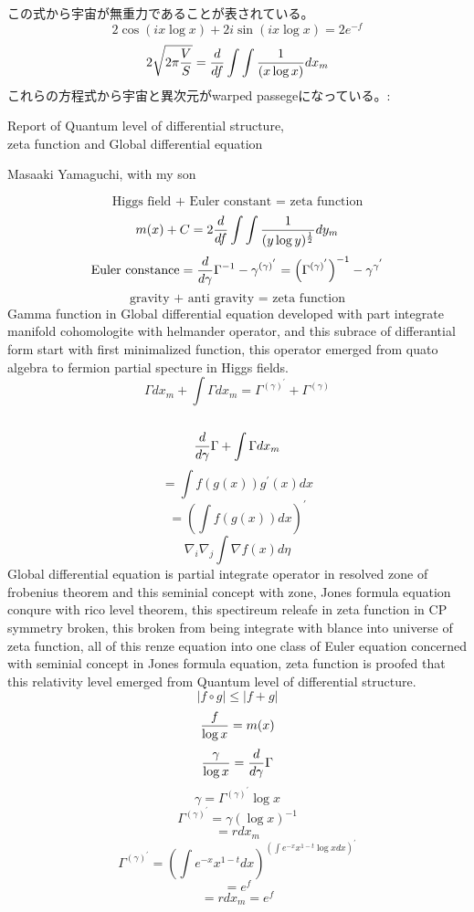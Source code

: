 \documentclass{jsarticle}
\begin{document}
{  この式から宇宙が無重力であることが表されている。
  $$ 2 \cos (i x \log x) + 2 i \sin(i x \log x) = 2 e^{-f} $$
  $$ 2 \sqrt{2 \pi {V \over S}} = {d \over df} 
  \int \int{1 \over (x \log x)}dx_m$$
  これらの方程式から宇宙と異次元がwarped passegeになっている。:

\newpage
\begin{center}
\large	Report of Quantum level of differential structure, \\
zeta function and Global differential equation
\end{center}
\begin{center}
	Masaaki Yamaguchi, with my son
\end{center}

  $$ \text{Higgs field + Euler constant = zeta function} $$
  $$ m(x) + C = 2 {d \over df}\int\int {1 \over (y \log y)^{1 \over 2}}dy_m$$
  $$ \text{Euler constance} = {d \over d \gamma}\Gamma^{-1} - \gamma^{(\gamma)
  ^{'}} = {\left(\Gamma^{(\gamma)^{'}}\right)}^{-1} - \gamma^{\gamma^{'}} $$
  $$ \text{gravity + anti gravity = zeta function} $$
  Gamma function in Global differential equation developed with part integrate
  manifold cohomologite with helmander operator, and this subrace of 
  differantial form start with first minimalized function, this operator
  emerged from quato algebra to fermion partial specture in Higgs fields.
  $$ \Gamma dx_m + \int \Gamma dx_m = \Gamma^{(\gamma)^{'}} + \Gamma^{(
  \gamma)} $$　
  $$ {d \over d \gamma}\Gamma + \int \Gamma dx_m $$
  $$ = \int f(g(x))g^{'}(x)dx $$
  $$ = \left(\int f(g(x))dx\right)^{'} $$
  $$ \nabla_i \nabla_j \int \nabla f(x) d \eta $$
  Global differential equation is partial integrate operator in resolved
  zone of frobenius theorem and this seminial concept with zone,
  Jones formula equation conqure with rico level theorem,
  this spectireum releafe in zeta function in CP symmetry broken,
  this broken from being integrate with blance into universe of zeta function,
  all of this renze equation into one class of Euler equation concerned with
  seminial concept in Jones formula equation, 
  zeta function is proofed that this relativity level 
  emerged from Quantum level of differential structure.
    $$ |f \circ g| \le |f + g| $$
  $$ {f \over \log x} = m(x) $$
  $$ {\gamma \over \log x} = {d \over d \gamma}\Gamma $$
  $$ \gamma = \Gamma^{(\gamma)^{'}}\log x$$
  $$ \Gamma^{(\gamma)^{'}} = \gamma (\log x)^{-1} $$
  $$ = r dx_m $$
  $$ \Gamma^{(\gamma)^{'}} = \left(\int e^{-x}x^{1 - t}dx\right)^{
	  \left(\int e^{-x}x^{1 - t} \log x dx\right)^{'}} $$
  $$ = e^{f} $$
  $$ = r dx_m = e^{f} $$
 
}
\end{document}
